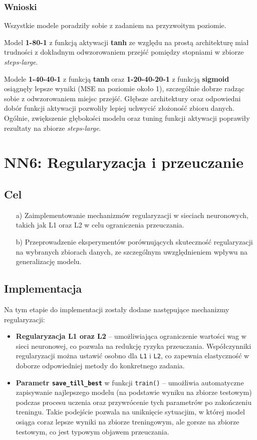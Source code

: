 \documentclass{article}
\begin{document}
\subsubsection*{Wnioski}
Wszystkie modele poradziły sobie z zadaniem na przyzwoitym poziomie.

Model \textbf{1-80-1} z funkcją aktywacji \textbf{tanh} ze względu na prostą architekturę miał trudności z dokładnym odwzorowaniem przejść pomiędzy stopniami w zbiorze \textit{steps-large}.

Modele \textbf{1-40-40-1} z funkcją \textbf{tanh} oraz \textbf{1-20-40-20-1} z funkcją \textbf{sigmoid} osiągnęły lepsze wyniki (MSE na poziomie około 1), szczególnie dobrze radząc sobie z odwzorowaniem miejsc przejść. Głębsze architektury oraz odpowiedni dobór funkcji aktywacji pozwoliły lepiej uchwycić złożoność zbioru danych. Ogólnie, zwiększenie głębokości modelu oraz tuning funkcji aktywacji poprawiły rezultaty na zbiorze \textit{steps-large}.

\section*{NN6: Regularyzacja i przeuczanie}
\subsection*{Cel}
\begin{enumerate}
    \item[a)] Zaimplementowanie mechanizmów regularyzacji w sieciach neuronowych, takich jak L1 oraz L2 w celu ograniczenia przeuczania.
    \item[b)] Przeprowadzenie eksperymentów porównujących skuteczność regularyzacji na wybranych zbiorach danych, ze szczególnym uwzględnieniem wpływu na generalizację modelu.
\end{enumerate}

\subsection*{Implementacja}
Na tym etapie do implementacji zostały dodane następujące mechanizmy regularyzacji:
\begin{itemize}
    \item \textbf{Regularyzacja L1 oraz L2} -- umożliwiająca ograniczenie wartości wag w sieci neuronowej, co pozwala na redukcję ryzyka przeuczania. Współczynniki regularyzacji można ustawić osobno dla \texttt{L1} i \texttt{L2}, co zapewnia elastyczność w doborze odpowiedniej metody do konkretnego zadania.
    \item \textbf{Parametr \texttt{save\_till\_best}} w funkcji \texttt{train()} -- umożliwia automatyczne zapisywanie najlepszego modelu (na podstawie wyniku na zbiorze testowym) podczas procesu uczenia oraz przywrócenie tych parametrów po zakończeniu treningu. Takie podejście pozwala na uniknięcie sytuacjim, w której model osiąga coraz lepsze wyniki na zbiorze treningowym, ale gorsze na zbiorze testowym, co jest typowym objawem przeuczania.
\end{itemize}
\end{document}
